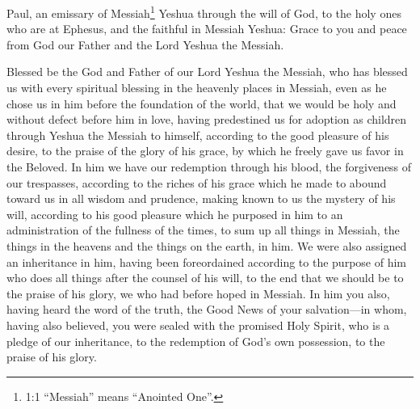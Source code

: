 \newpage
\null
\thispagestyle{empty}
\newpage






\vspace{-1.36in}

\mychapter{} \myverse*{}Paul, an emissary of Messiah\footnote{1:1 “Messiah” means “Anointed One”.} Yeshua through the will of God, to the holy ones who
are at Ephesus, and the faithful in Messiah Yeshua:
\myverse{}Grace to you and peace from God our Father and the Lord Yeshua the Messiah.

\myverse{}Blessed be the God and Father of our Lord Yeshua the Messiah, who
has blessed us with every spiritual blessing in the heavenly places in Messiah,
\myverse{}even as he chose us in him before the foundation of the world, that we would
be holy and without defect before him in love,
\myverse{}having predestined us for adoption as children through Yeshua the Messiah to
himself, according to the good pleasure of his desire,
\myverse{}to the praise of the glory of his grace, by which he freely gave us favor in
the Beloved.
\myverse{}In him we have our redemption through his blood, the forgiveness of our trespasses,
according to the riches of his grace
\myverse{}which he made to abound toward us in all wisdom and prudence,
\myverse{}making known to us the mystery of his will, according to his good pleasure which
he purposed in him
\myverse{}to an administration of the fullness of the times, to sum up all things in
Messiah, the things in the heavens and the things on the earth, in him.
\myverse{}We were also assigned an inheritance in him, having been foreordained according
to the purpose of him who does all things after the counsel of his will,
\myverse{}to the end that we should be to the praise of his glory, we who had before
hoped in Messiah.
\myverse{}In him you also, having heard the word of the truth, the Good News of your
salvation—in whom, having also believed, you were sealed with the promised Holy Spirit,
\myverse{}who is a pledge of our inheritance, to the redemption of God’s own possession,
to the praise of his glory.

